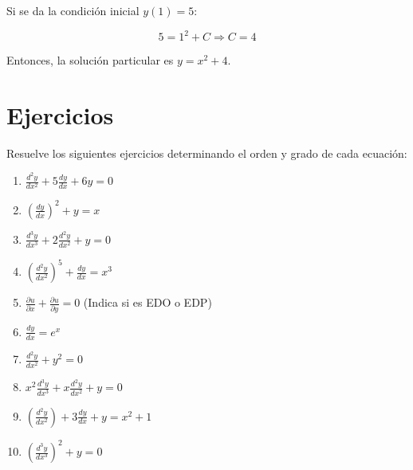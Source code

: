 Si se da la condición inicial \( y(1) = 5 \):

\begin{equation}
5 = 1^2 + C \Rightarrow C = 4
\end{equation}

Entonces, la solución particular es \( y = x^2 + 4 \).

\section{Ejercicios}
Resuelve los siguientes ejercicios determinando el orden y grado de cada ecuación:

\begin{enumerate}
    \item \( \frac{d^2y}{dx^2} + 5\frac{dy}{dx} + 6y = 0 \)
    \item \( \left( \frac{dy}{dx} \right)^2 + y = x \)
    \item \( \frac{d^3y}{dx^3} + 2\frac{d^2y}{dx^2} + y = 0 \)
    \item \( \left( \frac{d^2y}{dx^2} \right)^{5} + \frac{dy}{dx} = x^3 \)
    \item \( \frac{\partial u}{\partial x} + \frac{\partial u}{\partial y} = 0 \) (Indica si es EDO o EDP)
    \item \( \frac{dy}{dx} = e^x \)
    \item \( \frac{d^2y}{dx^2} + y^2 = 0 \)
    \item \( x^2\frac{d^3y}{dx^3} + x\frac{d^2y}{dx^2} + y = 0 \)
    \item \( \left( \frac{d^2y}{dx^2} \right) + 3 \frac{dy}{dx} + y = x^2 + 1 \)
    \item \( \left( \frac{d^3y}{dx^3} \right)^2 + y = 0 \)
\end{enumerate}

